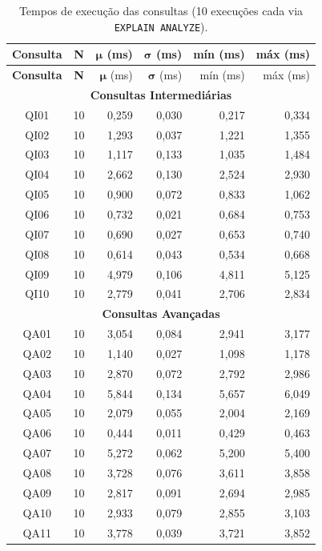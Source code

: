 \documentclass[12pt]{article}
\begin{document}
\begin{longtable}{|c|c|r|r|r|r|}
\caption{Tempos de execução das consultas (10 execuções cada via \texttt{EXPLAIN ANALYZE}).}
\label{tab:tempos-execucao}\\
\hline
\textbf{Consulta} & \textbf{N} & $\boldsymbol{\mu}$ \textbf{(ms)} & $\boldsymbol{\sigma}$ \textbf{(ms)} & \textbf{mín (ms)} & \textbf{máx (ms)} \\
\hline
\endfirsthead
\hline
\textbf{Consulta} & \textbf{N} & $\boldsymbol{\mu}$ (ms) & $\boldsymbol{\sigma}$ (ms) & mín (ms) & máx (ms) \\
\hline
\endhead
\multicolumn{6}{|c|}{\textbf{Consultas Intermediárias}} \\
\hline
QI01 & 10 & 0,259 & 0,030 & 0,217 & 0,334 \\
QI02 & 10 & 1,293 & 0,037 & 1,221 & 1,355 \\
QI03 & 10 & 1,117 & 0,133 & 1,035 & 1,484 \\
QI04 & 10 & 2,662 & 0,130 & 2,524 & 2,930 \\
QI05 & 10 & 0,900 & 0,072 & 0,833 & 1,062 \\
QI06 & 10 & 0,732 & 0,021 & 0,684 & 0,753 \\
QI07 & 10 & 0,690 & 0,027 & 0,653 & 0,740 \\
QI08 & 10 & 0,614 & 0,043 & 0,534 & 0,668 \\
QI09 & 10 & 4,979 & 0,106 & 4,811 & 5,125 \\
QI10 & 10 & 2,779 & 0,041 & 2,706 & 2,834 \\
\hline
\multicolumn{6}{|c|}{\textbf{Consultas Avançadas}} \\
\hline
QA01 & 10 & 3,054 & 0,084 & 2,941 & 3,177 \\
QA02 & 10 & 1,140 & 0,027 & 1,098 & 1,178 \\
QA03 & 10 & 2,870 & 0,072 & 2,792 & 2,986 \\
QA04 & 10 & 5,844 & 0,134 & 5,657 & 6,049 \\
QA05 & 10 & 2,079 & 0,055 & 2,004 & 2,169 \\
QA06 & 10 & 0,444 & 0,011 & 0,429 & 0,463 \\
QA07 & 10 & 5,272 & 0,062 & 5,200 & 5,400 \\
QA08 & 10 & 3,728 & 0,076 & 3,611 & 3,858 \\
QA09 & 10 & 2,817 & 0,091 & 2,694 & 2,985 \\
QA10 & 10 & 2,933 & 0,079 & 2,855 & 3,103 \\
QA11 & 10 & 3,778 & 0,039 & 3,721 & 3,852 \\

\end{longtable}
\end{document}
